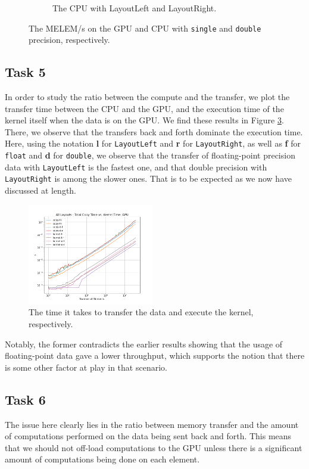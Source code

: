 \documentclass[10pt]{article}
\begin{document}
\begin{figure}[!ht]
\begin{subfigure}[b]{0.49\textwidth}
        \caption{The CPU with LayoutLeft and LayoutRight.}
        \label{fig:all_melems_cpu}
    \end{subfigure}\hfill
    \caption{The MELEM/s on the GPU and CPU with \texttt{single} and \texttt{double} precision, respectively.}
    \label{fig:all_melems}
\end{figure}
\subsection{Task 5}
In order to study the ratio between the compute and the transfer, we plot the transfer time between the CPU and the GPU, and the execution time of the kernel itself when the data is on the GPU. We find these results in Figure \ref{fig:all_copykernel_gpu}. There, we observe that the transfers back and forth dominate the execution time. \\

Here, using the notation \textbf{l} for \texttt{LayoutLeft} and \textbf{r} for \texttt{LayoutRight}, as well as \textbf{f} for \texttt{float} and \textbf{d} for \texttt{double}, we observe that the transfer of floating-point precision data with \texttt{LayoutLeft} is the fastest one, and that double precision with \texttt{LayoutRight} is among the slower ones. That is to be expected as we now have discussed at length.

\begin{figure}[!ht]
    \centering
    \includegraphics[width=0.49\textwidth]{figs/all_copykernel_gpu.png}
    \caption{The time it takes to transfer the data and execute the kernel, respectively.}
    \label{fig:all_copykernel_gpu}
\end{figure}

Notably, the former contradicts the earlier results showing that the usage of floating-point data gave a lower throughput, which supports the notion that there is some other factor at play in that scenario. 
\subsection{Task 6}
The issue here clearly lies in the ratio between memory transfer and the amount of computations performed on the data being sent back and forth. This means that we should not off-load computations to the GPU unless there is a significant amount of computations being done on each element. \\
\end{document}
